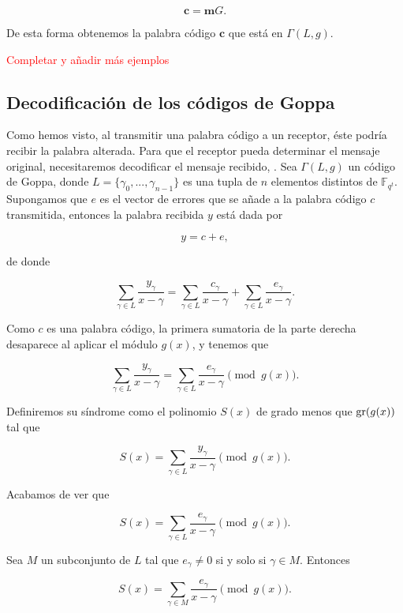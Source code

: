 $$\textbf{c} = \textbf{m} G.$$

De esta forma obtenemos la palabra código $\textbf{c}$ que está en $\Gamma (L, g)$.

\begin{exampleth}
\end{exampleth}

\textcolor{red}{Completar y añadir más ejemplos}

\subsection{Decodificación de los códigos de Goppa}

Como hemos visto, al transmitir una palabra código a un receptor, éste podría recibir la palabra alterada. Para que el receptor pueda determinar el mensaje original, necesitaremos decodificar el mensaje recibido, \cite{Goppa_codes_1973}. Sea $\Gamma(L,g)$ un código de Goppa, donde $L = \{ \gamma_0, ..., \gamma_{n-1} \}$ es una tupla de $n$ elementos distintos de $\mathbb{F}_{q^t}$. Supongamos que $e$ es el vector de errores que se añade a la palabra código $c$ transmitida, entonces la palabra recibida $y$ está dada por

$$y = c + e,$$

de donde 

$$\sum_{\gamma \in L} \frac{y_\gamma}{x - \gamma} = \sum_{\gamma \in L} \frac{c_\gamma}{x - \gamma} + \sum_{\gamma \in L} \frac{e_\gamma}{x - \gamma}.$$

Como $c$ es una palabra código, la primera sumatoria de la parte derecha desaparece al aplicar el módulo $g(x)$, y tenemos que

$$\sum_{\gamma \in L} \frac{y_\gamma}{x - \gamma} = \sum_{\gamma \in L} \frac{e_\gamma}{x - \gamma} \pmod{g(x)}.$$

Definiremos su síndrome como el polinomio $S(x)$ de grado menos que $\operatorname{gr}(g(x))$ tal que 

$$S(x) = \sum_{\gamma \in L} \frac{y_\gamma}{x - \gamma} \pmod{g(x)}.$$

Acabamos de ver que 

$$S(x) = \sum_{\gamma \in L} \frac{e_\gamma}{x - \gamma} \pmod{g(x)}.$$

Sea $M$ un subconjunto de $L$ tal que $e_{\gamma} \neq 0$ si y solo si $\gamma \in M$. Entonces

\begin{equation}
    \label{def:sindrome}
    S(x) = \sum_{\gamma \in M} \frac{e_\gamma}{x - \gamma} \pmod{g(x)}.
\end{equation}

